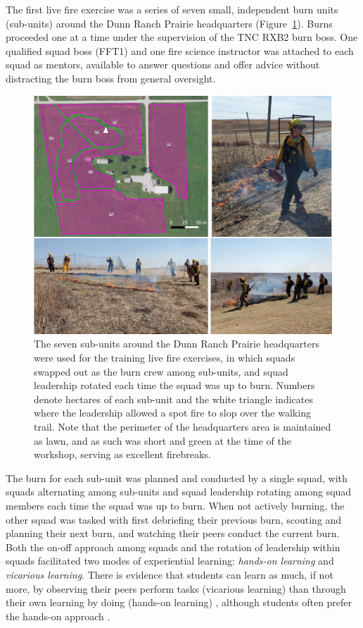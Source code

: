 \documentclass[fire,casereport,accept,moreauthors,pdftex]{Definitions/mdpi}  %
\begin{document}
The first live fire exercise was a series of seven small, independent burn units (sub-units) around the Dunn Ranch Prairie headquarters (Figure~\ref{HQmap}).
Burns proceeded one at a time under the supervision of the TNC RXB2 burn boss.
One qualified squad boss (FFT1) and one fire science instructor was attached to each squad as mentors, available to answer questions and offer advice without distracting the burn boss from general oversight.

\begin{figure}[H]
\includegraphics[width=1\columnwidth]{HQburns.pdf}
\caption{\label{HQmap}The seven sub-units around the Dunn Ranch Prairie headquarters were used for the training live fire exercises, in which squads swapped out as the burn crew among sub-units, and squad leadership rotated each time the squad was up to burn. Numbers denote hectares of each sub-unit and the white triangle indicates where the leadership allowed a spot fire to slop over the walking trail. Note that the perimeter of the headquarters area is maintained as lawn, and as such was short and green at the time of the workshop, serving as excellent firebreaks.}
\end{figure}

The burn for each sub-unit was planned and conducted by a single squad, with squads alternating among sub-units and squad leadership rotating among squad members each time the squad was up to burn.
When not actively burning, the other squad was tasked with first debriefing their previous burn, scouting and planning their next burn, and watching their peers conduct the current burn.
Both the on-off approach among squads and the rotation of leadership within squads facilitated two modes of experiential learning: \emph{hands-on learning} and \emph{vicarious learning}.
There is evidence that students can learn as much, if not more, by observing their peers perform tasks (vicarious learning) than through their own learning by doing (hands-on learning) \citep{stegmann2012}, although students often prefer the hands-on approach \citep{reime2017}.
\end{document}
